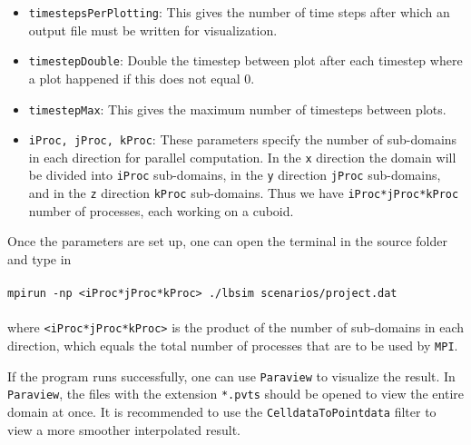 \documentclass[11pt]{article}
\begin{document}
\begin{itemize}
	\item \verb|timestepsPerPlotting|: This gives the number of time steps after which an output file must be written for visualization.
    \item \verb|timestepDouble|: Double the timestep between plot after each timestep where a plot happened if this does not equal 0.
    \item \verb|timestepMax|: This gives the maximum number of timesteps between plots.
	\item \verb|iProc, jProc, kProc|: These parameters specify the number of sub-domains in each direction for parallel computation. In the \verb|x| direction the domain will be divided into \verb|iProc| sub-domains, in the \verb|y| direction \verb|jProc| sub-domains, and in the \verb|z| direction \verb|kProc| sub-domains. Thus we have \verb|iProc*jProc*kProc| number of processes, each working on a cuboid.
\end{itemize}

Once the parameters are set up, one can open the terminal in the source folder and type in\\ \\ \verb|mpirun -np <iProc*jProc*kProc> ./lbsim scenarios/project.dat| \\ \\ where \verb|<iProc*jProc*kProc>| is the product of the number of sub-domains in each direction, which equals the total number of processes that are to be used by \verb|MPI|.

If the program runs successfully, one can use \verb|Paraview| to visualize the result. In \verb|Paraview|, the files with the extension \verb|*.pvts| should be opened to view the entire domain at once. It is recommended to use the \verb|CelldataToPointdata| filter to view a more smoother interpolated result.
\end{document}
